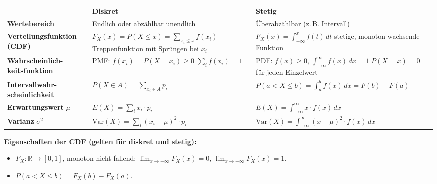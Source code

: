 \medskip
\begin{table}[H]
\centering\small
\begin{tabular}{p{3.2cm} p{5.5cm} p{5.5cm}}
\toprule
 & \textbf{Diskret} & \textbf{Stetig} \\
\midrule
\textbf{Wertebereich} & Endlich oder abzählbar unendlich & Überabzählbar (z.\,B. Intervall) \\[4pt]
\textbf{Verteilungsfunktion (CDF)} & $F_X(x) = P(X \leq x) = \sum_{x_i \leq x} f(x_i)$ \newline Treppenfunktion mit Sprüngen bei $x_i$ & $F_X(x) = \int_{-\infty}^{x} f(t)\,dt$ \newline stetige, monoton wachsende Funktion \\[8pt]
\textbf{Wahrscheinlich-\allowbreak keitsfunktion} & PMF: $f(x_i) = P(X = x_i) \geq 0$ \newline $\sum_i f(x_i) = 1$ & PDF: $f(x) \geq 0$, $\int_{-\infty}^{\infty} f(x)\,dx = 1$ \newline $P(X = x) = 0$ für jeden Einzelwert \\[8pt]
\textbf{Intervallwahr-\allowbreak scheinlichkeit} & $P(X \in A) = \sum_{x_i \in A} p_i$ & $P(a < X \leq b) = \int_a^b f(x)\,dx = F(b)-F(a)$ \\[4pt]
\textbf{Erwartungswert} $\mu$ & $E(X) = \sum_i x_i \cdot p_i$ & $E(X) = \int_{-\infty}^{\infty} x \cdot f(x)\,dx$ \\[4pt]
\textbf{Varianz} $\sigma^2$ & $\text{Var}(X) = \sum_i (x_i - \mu)^2 \cdot p_i$ & $\text{Var}(X) = \int_{-\infty}^{\infty}(x-\mu)^2 \cdot f(x)\,dx$ \\
\bottomrule
\end{tabular}
\end{table}

\noindent\textbf{Eigenschaften der CDF (gelten für diskret und stetig):}
\begin{itemize}[leftmargin=1.5em]
    \item $F_X: \mathbb{R} \to [0,1]$, monoton nicht-fallend; $\lim_{x \to -\infty} F_X(x) = 0$, $\lim_{x \to +\infty} F_X(x) = 1$.
    \item $P(a < X \leq b) = F_X(b) - F_X(a)$.
\end{itemize}

